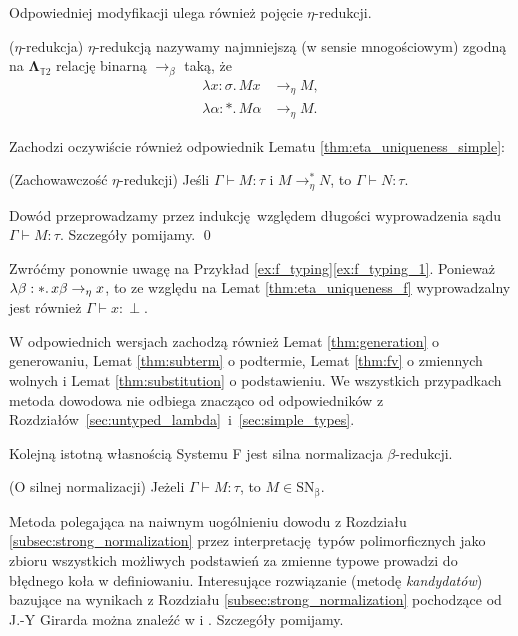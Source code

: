 Odpowiedniej modyfikacji ulega również pojęcie \(\eta\)-redukcji.
  \begin{definicja}(\(\eta\)-redukcja)
    \(\eta\)-redukcją nazywamy najmniejszą (w sensie mnogościowym) zgodną na \(\mathbf{\Lambda}_{\mathbb{T}2}\) relację binarną \(\to_\beta\) taką, że
  \begin{align*}
    \lambda x:\sigma.\,Mx &\to_\eta M,\\
    \lambda \alpha:*.\,M\alpha &\to_\eta M.
  \end{align*}
  \end{definicja}

Zachodzi oczywiście również odpowiednik Lematu \ref{thm:eta_uniqueness_simple}:
\begin{lemat}(Zachowawczość \(\eta\)-redukcji)\label{thm:eta_uniqueness_f}
  Jeśli \(\Gamma\vdash M:\tau\) i \(M\to^{*}_\eta N\), to \(\Gamma\vdash N:\tau\).
\end{lemat}
\begin{dowod}
  Dowód przeprowadzamy przez indukcję względem długości wyprowadzenia sądu \(\Gamma\vdash M:\tau\). Szczegóły pomijamy. \qed
\end{dowod}

\begin{przyklad} Zwróćmy ponownie uwagę na Przykład \ref{ex:f_typing}\ref{ex:f_typing_1}. Ponieważ \(\lambda \beta : *.\,x\beta\nobreak\to_\eta\nobreak x\), to ze względu na Lemat \ref{thm:eta_uniqueness_f} wyprowadzalny jest również \(\Gamma\vdash x:\perp\).
\end{przyklad}

W odpowiednich wersjach zachodzą również Lemat \ref{thm:generation} o generowaniu, Lemat \ref{thm:subterm} o podtermie, Lemat \ref{thm:fv} o zmiennych wolnych i Lemat \ref{thm:substitution} o podstawieniu. We wszystkich przypadkach metoda dowodowa nie odbiega znacząco od odpowiedników z Rozdziałów~\ref{sec:untyped_lambda}~i~\ref{sec:simple_types}.

Kolejną istotną własnością Systemu F jest silna normalizacja \(\beta\)-redukcji.

\begin{twierdzenie}(O silnej normalizacji)
  Jeżeli \(\Gamma\vdash M:\tau\), to \(M\in\mathrm{SN_\beta}\).
\end{twierdzenie}
\begin{dowod}
  Metoda polegająca na naiwnym uogólnieniu dowodu z Rozdziału \ref{subsec:strong_normalization} przez interpretację typów polimorficznych jako zbioru wszystkich możliwych podstawień za zmienne typowe prowadzi do błędnego koła w definiowaniu. Interesujące rozwiązanie (metodę \emph{kandydatów}) bazujące na wynikach z Rozdziału \ref{subsec:strong_normalization} pochodzące od J.-Y Girarda można znaleźć w \cite[Rozdział 11.5]{Urzyczyn2006} i \cite[Rozdział 6]{Girard:1989:PT:64805}. Szczegóły pomijamy.
\end{dowod}


